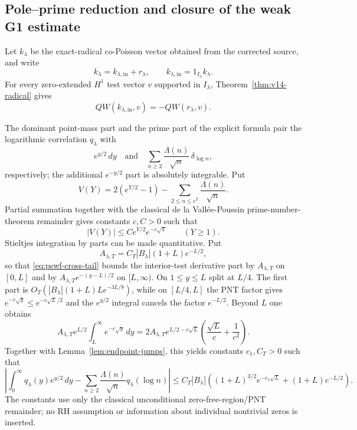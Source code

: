 \documentclass[11pt]{article}
\theoremstyle{remark}
\begin{document}
\subsection*{Pole--prime reduction and closure of the weak G1 estimate}
Let $k_\lambda$ be the exact-radical co-Poisson vector obtained from the corrected source, and write
\[
 k_\lambda=k_{\lambda,\mathrm{in}}+r_\lambda,
 \qquad k_{\lambda,\mathrm{in}}=1_{I_\lambda}k_\lambda.
\]
For every zero-extended $H^1$ test vector $v$ supported in $I_\lambda$,
Theorem~\ref{thm:v14-radical} gives
\begin{equation}\label{eq:radical-truncation}
 QW(k_{\lambda,\mathrm{in}},v)=-QW(r_\lambda,v).
\end{equation}

The dominant point-mass part and the prime part of the explicit formula pair the logarithmic correlation $q_\lambda$ with
\[
 e^{y/2}\,dy
 \quad\text{and}\quad
 \sum_{n\ge2}\frac{\Lambda(n)}{\sqrt n}\,\delta_{\log n},
\]
respectively; the additional $e^{-y/2}$ part is absolutely integrable.  Put
\[
 V(Y)=2(e^{Y/2}-1)-\sum_{2\le n\le e^Y}\frac{\Lambda(n)}{\sqrt n}.
\]
Partial summation together with the classical de la Vall\'ee-Poussin prime-number-theorem remainder gives constants $c,C>0$ such that
\begin{equation}\label{eq:centered-prime-cumulative}
 |V(Y)|\le C e^{Y/2}e^{-c\sqrt Y}\qquad(Y\ge1).
\end{equation}
Stieltjes integration by parts can be made quantitative.  Put
\[
 A_{\lambda,T}=C_T|B_\lambda|(1+L)e^{-L/2},
\]
so that \eqref{eq:pswf-cross-tail} bounds the interior-test derivative part by
$A_{\lambda,T}$ on $[0,L]$ and by
$A_{\lambda,T}e^{-(y-L)/2}$ on $[L,\infty)$.  On $1\le y\le L$ split at
$L/4$.  The first part is
$O_T(|B_\lambda|(1+L)L e^{-3L/8})$, while on $[L/4,L]$ the PNT factor gives
$e^{-c\sqrt y}\le e^{-c\sqrt L/2}$ and the $e^{y/2}$ integral cancels the
factor $e^{-L/2}$.  Beyond $L$ one obtains
\[
 A_{\lambda,T}e^{L/2}\int_L^\infty e^{-c\sqrt y}\,dy
 =2A_{\lambda,T}e^{L/2-c\sqrt L}
 \left(\frac{\sqrt L}{c}+\frac1{c^2}\right).
\]
Together with Lemma~\ref{lem:endpoint-jumps}, this yields constants
$c_1,C_T>0$ such that
\begin{equation}\label{eq:pole-prime-small}
 \left|\int_0^\infty q_\lambda(y)e^{y/2}\,dy
 -\sum_{n\ge2}\frac{\Lambda(n)}{\sqrt n}q_\lambda(\log n)\right|
 \le C_T|B_\lambda|\left((1+L)^{3/2}e^{-c_1\sqrt L}
 +(1+L)e^{-L/2}\right).
\end{equation}
The constants use only the classical unconditional zero-free-region/PNT remainder; no
RH assumption or information about individual nontrivial zeros is inserted.
\end{document}
